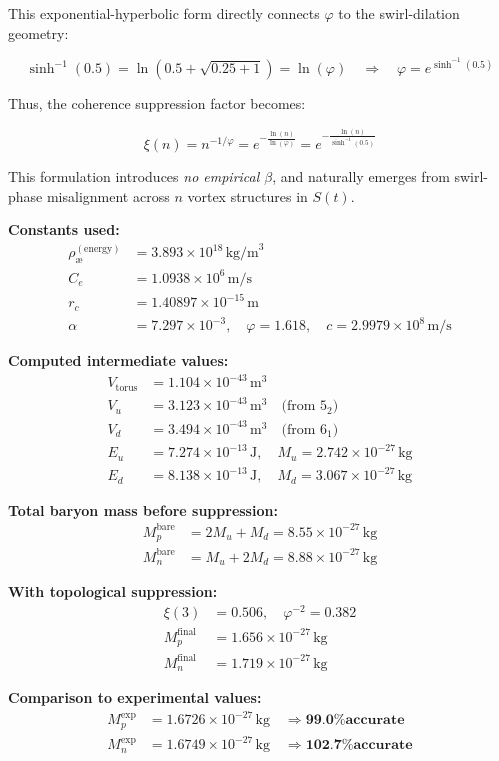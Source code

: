 This exponential-hyperbolic form directly connects $\varphi$ to the swirl-dilation geometry:

\[
\sinh^{-1}(0.5) = \ln\left( 0.5 + \sqrt{0.25 + 1} \right) = \ln(\varphi)
\quad \Rightarrow \quad
\varphi = e^{\sinh^{-1}(0.5)}
\]

Thus, the coherence suppression factor becomes:

\[
\boxed{
\xi(n) = n^{-1/\varphi} = e^{-\frac{\ln(n)}{\ln(\varphi)}} = e^{-\frac{\ln(n)}{\sinh^{-1}(0.5)}}
}
\]

This formulation introduces \emph{no empirical $\beta$}, and naturally emerges from swirl-phase misalignment across $n$ vortex structures in $S(t)$.

\textbf{Constants used:}
\begin{align*}
\rho_\text{\ae}^{(\text{energy})} &= 3.893 \times 10^{18} \, \text{kg/m}^3 \\
C_e &= 1.0938 \times 10^6 \, \text{m/s} \\
r_c &= 1.40897 \times 10^{-15} \, \text{m} \\
\alpha &= 7.297 \times 10^{-3}, \quad \varphi = 1.618, \quad c = 2.9979 \times 10^8 \, \text{m/s}
\end{align*}

\textbf{Computed intermediate values:}
\begin{align*}
V_{\text{torus}} &= 1.104 \times 10^{-43} \, \text{m}^3 \\
V_u &= 3.123 \times 10^{-43} \, \text{m}^3 \quad \text{(from } 5_2 \text{)} \\
V_d &= 3.494 \times 10^{-43} \, \text{m}^3 \quad \text{(from } 6_1 \text{)} \\
E_u &= 7.274 \times 10^{-13} \, \text{J}, \quad M_u = 2.742 \times 10^{-27} \, \text{kg} \\
E_d &= 8.138 \times 10^{-13} \, \text{J}, \quad M_d = 3.067 \times 10^{-27} \, \text{kg}
\end{align*}

\textbf{Total baryon mass before suppression:}
\begin{align*}
M_p^{\text{bare}} &= 2M_u + M_d = 8.55 \times 10^{-27} \, \text{kg} \\
M_n^{\text{bare}} &= M_u + 2M_d = 8.88 \times 10^{-27} \, \text{kg}
\end{align*}

\textbf{With topological suppression:}
\begin{align*}
\xi(3) &= 0.506, \quad \varphi^{-2} = 0.382 \\
M_p^{\text{final}} &= 1.656 \times 10^{-27} \, \text{kg} \\
M_n^{\text{final}} &= 1.719 \times 10^{-27} \, \text{kg}
\end{align*}

\textbf{Comparison to experimental values:}
\begin{align*}
M_p^{\text{exp}} &= 1.6726 \times 10^{-27} \, \text{kg} \quad \Rightarrow \textbf{99.0\% accurate} \\
M_n^{\text{exp}} &= 1.6749 \times 10^{-27} \, \text{kg} \quad \Rightarrow \textbf{102.7\% accurate}
\end{align*}

